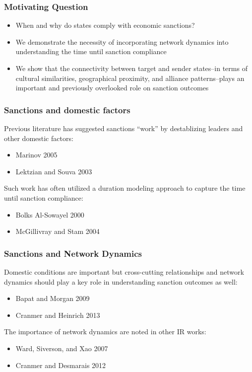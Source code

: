 \begin{frame}
\titlepage
\end{frame}

\begin{frame}
\frametitle{Motivating Question}

\begin{itemize}
	\item When and why do states comply with economic sanctions? 
	\item We demonstrate the necessity of incorporating network dynamics into understanding the time until sanction compliance
	\item We show that the connectivity between target and sender states--in terms of cultural similarities, geographical proximity, and alliance patterns--plays an important and previously overlooked role on sanction outcomes
\end{itemize}

\end{frame}

\begin{frame}
\frametitle{Sanctions and domestic factors}
Previous literature has suggested sanctions ``work'' by destablizing leaders and other domestic factors:
\begin{itemize}
	\item Marinov 2005
	\item Lektzian and Souva 2003
\end{itemize}

Such work has often utilized a duration modeling approach to capture the time until sanction compliance: 
\begin{itemize}
	\item Bolks Al-Sowayel 2000
	\item McGillivray and Stam 2004
\end{itemize}


\end{frame}

\begin{frame}
\frametitle{Sanctions and Network Dynamics}
Domestic conditions are important but cross-cutting relationships and network dynamics should play a key role in understanding sanction outcomes as well:
\begin{itemize}
	\item Bapat and Morgan 2009
	\item Cranmer and Heinrich 2013
\end{itemize}

The importance of network dynamics are noted in other IR works:
\begin{itemize}
	\item Ward, Siverson, and Xao 2007
	\item Cranmer and Desmarais 2012
\end{itemize} 
\end{frame}

